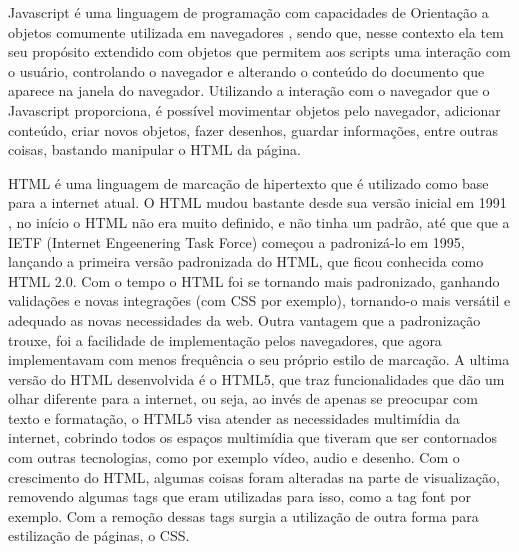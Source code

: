 Javascript é uma linguagem de programação com capacidades de Orientação a objetos comumente utilizada em
navegadores \cite{flanagan2006javascript}, sendo que, nesse contexto ela tem seu propósito extendido com objetos que permitem
aos scripts uma interação com o usuário, controlando o navegador e alterando o conteúdo
do documento que aparece na janela do navegador.
Utilizando a interação com o navegador que o Javascript proporciona, é possível movimentar
objetos pelo navegador, adicionar conteúdo, criar novos objetos, fazer desenhos, guardar
informações, entre outras coisas, bastando manipular o HTML da página.

HTML é uma linguagem de marcação de hipertexto que é utilizado como base para a internet
atual. O HTML mudou bastante desde sua versão inicial em 1991
\cite{powell2003html}, no início o HTML não era muito definido, e não tinha um padrão, até que que a
IETF (Internet Engeenering Task Force) começou a padronizá-lo em 1995, lançando a
primeira versão padronizada do HTML, que ficou conhecida como HTML 2.0.
Com o tempo o HTML foi se tornando mais padronizado, ganhando validações e novas integrações
(com CSS por exemplo), tornando-o mais versátil e adequado as novas necessidades da
web. Outra vantagem que a padronização trouxe, foi a facilidade de implementação pelos
navegadores, que agora implementavam com menos frequência o seu próprio estilo de marcação.
A ultima versão do HTML desenvolvida é o HTML5, que traz funcionalidades que dão um
olhar diferente para a internet, ou seja, ao invés de apenas se preocupar com texto
e formatação, o HTML5 visa atender as necessidades multimídia da internet, cobrindo
todos os espaços multimídia que tiveram que ser contornados com outras tecnologias,
como por exemplo vídeo, audio e desenho.
Com o crescimento do HTML, algumas coisas foram alteradas na parte de visualização,
removendo algumas tags que eram utilizadas para isso, como a tag font por exemplo.
Com a remoção dessas tags surgia a utilização de outra forma para
estilização de páginas, o CSS.

